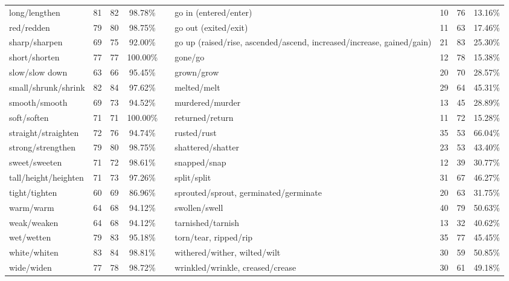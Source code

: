 \begin{tabular}{p{3cm}ccccp{3cm}ccc}
long/lengthen & 81 & 82 & 98.78\% & & go in (entered/enter) & 10 & 76 & 13.16\% \\
red/redden & 79 & 80 & 98.75\% & & go out (exited/exit) & 11 & 63 & 17.46\% \\
sharp/sharpen & 69 & 75 & 92.00\% & & go up (raised/rise, ascended/ascend, increased/increase, gained/gain) & 21 & 83 & 25.30\% \\
short/shorten & 77 & 77 & 100.00\% & & gone/go & 12 & 78 & 15.38\% \\
slow/slow down & 63 & 66 & 95.45\% & & grown/grow & 20 & 70 & 28.57\% \\
small/shrunk/shrink & 82 & 84 & 97.62\% & & melted/melt & 29 & 64 & 45.31\% \\
smooth/smooth & 69 & 73 & 94.52\% & & murdered/murder & 13 & 45 & 28.89\% \\
soft/soften & 71 & 71 & 100.00\% & & returned/return & 11 & 72 & 15.28\% \\
straight/straighten & 72 & 76 & 94.74\% & & rusted/rust & 35 & 53 & 66.04\% \\
strong/strengthen & 79 & 80 & 98.75\% & & shattered/shatter & 23 & 53 & 43.40\% \\
sweet/sweeten & 71 & 72 & 98.61\% & & snapped/snap & 12 & 39 & 30.77\% \\
tall/height/heighten & 71 & 73 & 97.26\% & & split/split & 31 & 67 & 46.27\% \\
tight/tighten & 60 & 69 & 86.96\% & & sprouted/sprout, germinated/germinate & 20 & 63 & 31.75\% \\
warm/warm & 64 & 68 & 94.12\% & & swollen/swell & 40 & 79 & 50.63\% \\
weak/weaken & 64 & 68 & 94.12\% & & tarnished/tarnish & 13 & 32 & 40.62\% \\
wet/wetten & 79 & 83 & 95.18\% & & torn/tear, ripped/rip & 35 & 77 & 45.45\% \\
white/whiten & 83 & 84 & 98.81\% & & withered/wither, wilted/wilt & 30 & 59 & 50.85\% \\
wide/widen & 77 & 78 & 98.72\% & & wrinkled/wrinkle, creased/crease & 30 & 61 & 49.18\%
\end{tabular}
